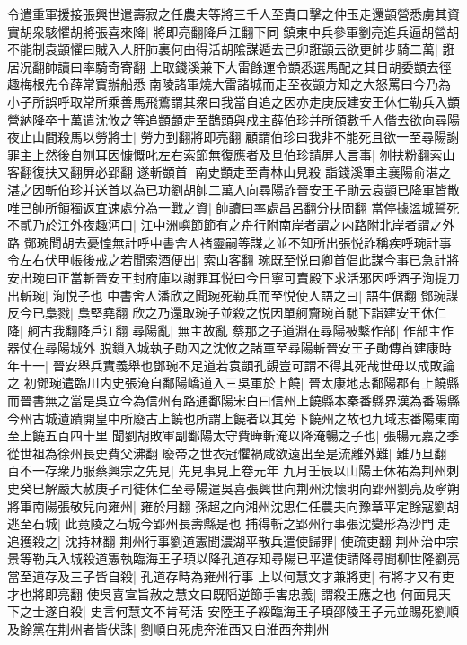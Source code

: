 令遣重軍援接張興世遣壽寂之任農夫等將三千人至貴口擊之仲玉走還顗營悉虜其資實胡衆駭懼胡將張喜來降|{
	將即亮翻降戶江翻下同}
鎮東中兵參軍劉亮進兵逼胡營胡不能制袁顗懼曰賊入人肝肺裏何由得活胡隂謀遁去己卯誑顗云欲更帥步騎二萬|{
	誑居况翻帥讀曰率騎奇寄翻}
上取錢溪兼下大雷餘運令顗悉選馬配之其日胡委顗去徑趣梅根先令薛常寶辦船悉南陵諸軍燒大雷諸城而走至夜顗方知之大怒罵曰今乃為小子所誤呼取常所乘善馬飛鷰謂其衆曰我當自追之因亦走庚辰建安王休仁勒兵入顗營納降卒十萬遣沈攸之等追顗顗走至鵲頭與戍主薛伯珍并所領數千人偕去欲向尋陽夜止山間殺馬以勞將士|{
	勞力到翻將即亮翻}
顧謂伯珍曰我非不能死且欲一至尋陽謝罪主上然後自刎耳因慷慨叱左右索節無復應者及旦伯珍請屏人言事|{
	刎扶粉翻索山客翻復扶又翻屏必郢翻}
遂斬顗首|{
	南史顗走至青林山見殺}
詣錢溪軍主襄陽俞湛之湛之因斬伯珍并送首以為已功劉胡帥二萬人向尋陽詐晉安王子勛云袁顗已降軍皆散唯已帥所領獨返宜速處分為一戰之資|{
	帥讀曰率處昌呂翻分扶問翻}
當停據湓城誓死不貳乃於江外夜趣沔口|{
	江中洲嶼節節有之舟行附南岸者謂之内路附北岸者謂之外路}
鄧琬聞胡去憂惶無計呼中書舍人禇靈嗣等謀之並不知所出張悦詐稱疾呼琬計事令左右伏甲帳後戒之若聞索酒便出|{
	索山客翻}
琬既至悦曰卿首倡此謀今事已急計將安出琬曰正當斬晉安王封府庫以謝罪耳悦曰今日寧可賣殿下求活邪因呼酒子洵提刀出斬琬|{
	洵悦子也}
中書舍人潘欣之聞琬死勒兵而至悦使人語之曰|{
	語牛倨翻}
鄧琬謀反今已梟戮|{
	梟堅堯翻}
欣之乃還取琬子並殺之悦因單舸齎琬首馳下詣建安王休仁降|{
	舸古我翻降戶江翻}
尋陽亂|{
	無主故亂}
蔡那之子道淵在尋陽被繫作部|{
	作部主作器仗在尋陽城外}
脱鎻入城執子勛囚之沈攸之諸軍至尋陽斬晉安王子勛傳首建康時年十一|{
	晉安舉兵實義舉也鄧琬不足道若袁顗孔覬豈可謂不得其死哉世毋以成敗論之}
初鄧琬遣臨川内史張淹自鄱陽嶠道入三吳軍於上饒|{
	晉太康地志鄱陽郡有上饒縣而晉書無之當是吳立今為信州有路通鄱陽宋白曰信州上饒縣本秦番縣界漢為番陽縣今州古城遺蹟開皇中所廢古上饒也所謂上饒者以其旁下饒州之故也九域志番陽東南至上饒五百四十里}
聞劉胡敗軍副鄱陽太守費曄斬淹以降淹暢之子也|{
	張暢元嘉之季從世祖為徐州長史費父沸翻}
廢帝之世衣冠懼禍咸欲遠出至是流離外難|{
	難乃旦翻}
百不一存衆乃服蔡興宗之先見|{
	先見事見上卷元年}
九月壬辰以山陽王休祐為荆州刺史癸巳解嚴大赦庚子司徒休仁至尋陽遣吳喜張興世向荆州沈懷明向郢州劉亮及寧朔將軍南陽張敬兒向雍州|{
	雍於用翻}
孫超之向湘州沈思仁任農夫向豫章平定餘寇劉胡逃至石城|{
	此竟陵之石城今郢州長壽縣是也}
捕得斬之郢州行事張沈變形為沙門走追獲殺之|{
	沈持林翻}
荆州行事劉道憲聞濃湖平散兵遣使歸罪|{
	使疏吏翻}
荆州治中宗景等勒兵入城殺道憲執臨海王子頊以降孔道存知尋陽已平遣使請降尋聞柳世隆劉亮當至道存及三子皆自殺|{
	孔道存時為雍州行事}
上以何慧文才兼將吏|{
	有將才又有吏才也將即亮翻}
使吳喜宣旨赦之慧文曰既䧟逆節手害忠義|{
	謂殺王應之也}
何面見天下之士遂自殺|{
	史言何慧文不肯苟活}
安陸王子綏臨海王子頊邵陵王子元並賜死劉順及餘黨在荆州者皆伏誅|{
	劉順自死虎奔淮西又自淮西奔荆州}
